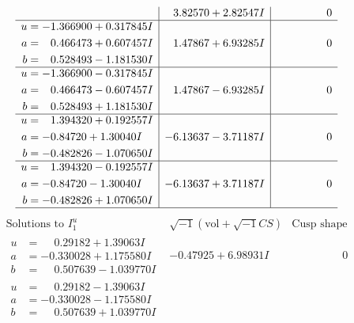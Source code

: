 \documentclass[1p]{elsarticle_modified}
\theoremstyle{definition}
\newcommand{\I}{\sqrt{-1}}
\begin{document}
$$\begin{array}{c|c|c}
 & \phantom{-}3.82570 + 2.82547 I & \phantom{-0.000000 } 0 \\ \hline\begin{aligned}
u &= -1.366900 + 0.317845 I \\
a &= \phantom{-}0.466473 + 0.607457 I \\
b &= \phantom{-}0.528493 - 1.181530 I\end{aligned}
 & \phantom{-}1.47867 + 6.93285 I & \phantom{-0.000000 } 0 \\ \hline\begin{aligned}
u &= -1.366900 - 0.317845 I \\
a &= \phantom{-}0.466473 - 0.607457 I \\
b &= \phantom{-}0.528493 + 1.181530 I\end{aligned}
 & \phantom{-}1.47867 - 6.93285 I & \phantom{-0.000000 } 0 \\ \hline\begin{aligned}
u &= \phantom{-}1.394320 + 0.192557 I \\
a &= -0.84720 + 1.30040 I \\
b &= -0.482826 - 1.070650 I\end{aligned}
 & -6.13637 - 3.71187 I & \phantom{-0.000000 } 0 \\ \hline\begin{aligned}
u &= \phantom{-}1.394320 - 0.192557 I \\
a &= -0.84720 - 1.30040 I \\
b &= -0.482826 + 1.070650 I\end{aligned}
 & -6.13637 + 3.71187 I & \phantom{-0.000000 } 0\\
 \hline 
 \end{array}$$\newpage$$\begin{array}{c|c|c}  
\text{Solutions to }I^u_{1}& \I (\text{vol} + \sqrt{-1}CS) & \text{Cusp shape}\\
 \hline 
\begin{aligned}
u &= \phantom{-}0.29182 + 1.39063 I \\
a &= -0.330028 + 1.175580 I \\
b &= \phantom{-}0.507639 - 1.039770 I\end{aligned}
 & -0.47925 + 6.98931 I & \phantom{-0.000000 } 0 \\ \hline\begin{aligned}
u &= \phantom{-}0.29182 - 1.39063 I \\
a &= -0.330028 - 1.175580 I \\
b &= \phantom{-}0.507639 + 1.039770 I\end{aligned}

\end{array}$$
\end{document}
